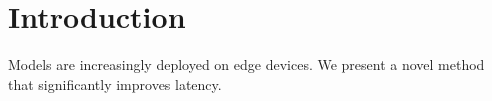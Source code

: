 \documentclass{article}
\newcommand{\ours}{FooNet}
\begin{document}
\begin{abstract}
We propose \ours{}, which reduces memory by 42.7\% and gets a 3.1$\times$ speedup.
\end{abstract}
\section{Introduction}
Models are increasingly deployed on edge devices. We present a novel method that significantly improves latency. %


\end{document}
